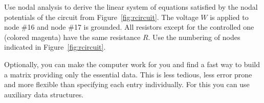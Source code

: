 \begin{problem}
\begin{subproblem}[3]\label{cimp:sp:2}
  Use nodal analysis to derive the linear system of equations satisfied by 
  the nodal potentials of the circuit from Figure~\ref{fig:rcircuit}. 
  The voltage $W$ is applied to node \#16 and node \#17 is grounded. 
  All resistors except for the controlled one (colored magenta) 
  have the same resistance $R$.
  Use the numbering of nodes indicated in Figure~\ref{fig:rcircuit}.
  
  \begin{hint}
    Optionally, you can make the computer work for you and find a fast way to build
    a matrix providing only the essential data. This is less tedious, less error
    prone and more flexible than specifying each entry individually. For this you
    can use auxiliary data structures.
  \end{hint}
  

\end{subproblem}
\end{problem}
